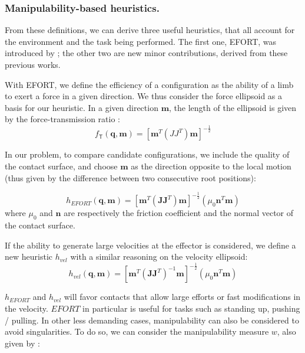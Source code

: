 \subsubsection{Manipulability-based heuristics.}
From these definitions, we can derive three useful heuristics, that all account for the environment and the task being performed.
The first one, EFORT, was introduced by \cite{Tonneau2014}; the other two are new minor contributions, derived from these previous works.

With EFORT, we define the efficiency of a configuration as the ability of a limb to exert a force in a given direction.
We thus consider the force ellipsoid as a basis for our heuristic.
In a given direction $\mathbf{m}$, the length of the ellipsoid is given by the force-transmission ratio \citep{1087795}:
\begin{equation*}
f_\mathsf{T}(\mathbf{q}, \mathbf{m}) = [\mathbf{m}^{T}(JJ^{T})\mathbf{m}]^{-\frac{1}{2}}
\end{equation*}

In our problem, to compare candidate configurations, we include the quality of the contact surface, and choose $\mathbf{m}$ as the direction
opposite to the local motion (thus given by the difference between two consecutive root positions):

\begin{equation}
h_{EFORT}(\mathbf{q}, \mathbf{m}) = [\mathbf{m}^{T}(\mathbf{J}\mathbf{J}^T)\mathbf{m}]^{-\frac{1}{2}} ( \mu_0 \mathbf{n}^T \mathbf{m})
\end{equation}
where $\mu_0$ and $\mathbf{n}$ are respectively the friction coefficient and the normal vector of the contact surface.


If the ability to generate large velocities at the effector is considered, we define a new heuristic $h_{vel}$ with a similar reasoning on the velocity ellipsoid:
\begin{equation}
h_{vel}(\mathbf{q}, \mathbf{m}) = [\mathbf{m}^{T}(\mathbf{J}\mathbf{J}^T)^{-1}\mathbf{m}]^{-\frac{1}{2}} ( \mu_0 \mathbf{n}^T \mathbf{m})
\end{equation}

$h_{EFORT}$ and $h_{vel}$ will favor contacts that allow large efforts or fast modifications in the velocity.
$EFORT$ in particular is useful for tasks such as standing up, pushing / pulling.
In other less demanding cases, manipulability can also be considered to avoid singularities.
To do so, we can consider the manipulability measure $w$, also given by \citeauthor{Yoshikawa1984}:


